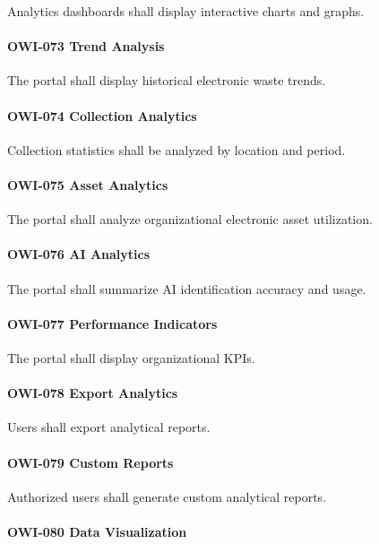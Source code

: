 Analytics dashboards shall display interactive charts and graphs.

\paragraph{OWI-073 Trend Analysis}

The portal shall display historical electronic waste trends.

\paragraph{OWI-074 Collection Analytics}

Collection statistics shall be analyzed by location and period.

\paragraph{OWI-075 Asset Analytics}

The portal shall analyze organizational electronic asset utilization.

\paragraph{OWI-076 AI Analytics}

The portal shall summarize AI identification accuracy and usage.

\paragraph{OWI-077 Performance Indicators}

The portal shall display organizational KPIs.

\paragraph{OWI-078 Export Analytics}

Users shall export analytical reports.

\paragraph{OWI-079 Custom Reports}

Authorized users shall generate custom analytical reports.

\paragraph{OWI-080 Data Visualization}

